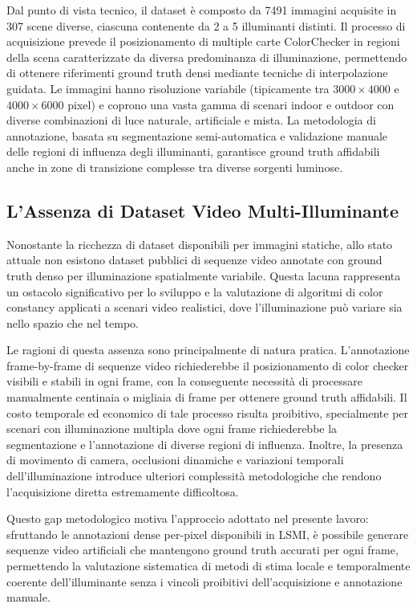 Dal punto di vista tecnico, il dataset è composto da 7491 immagini acquisite in 307 scene diverse, ciascuna contenente da 2 a 5 illuminanti distinti. Il processo di acquisizione prevede il posizionamento di multiple carte ColorChecker in regioni della scena caratterizzate da diversa predominanza di illuminazione, permettendo di ottenere riferimenti ground truth densi mediante tecniche di interpolazione guidata. Le immagini hanno risoluzione variabile (tipicamente tra $3000 \times 4000$ e $4000 \times 6000$ pixel) e coprono una vasta gamma di scenari indoor e outdoor con diverse combinazioni di luce naturale, artificiale e mista. La metodologia di annotazione, basata su segmentazione semi-automatica e validazione manuale delle regioni di influenza degli illuminanti, garantisce ground truth affidabili anche in zone di transizione complesse tra diverse sorgenti luminose.

\clearpage


\vspace{1.5cm}



\subsection{L'Assenza di Dataset Video Multi-Illuminante}

Nonostante la ricchezza di dataset disponibili per immagini statiche, allo stato attuale non esistono dataset pubblici di sequenze video annotate con ground truth denso per illuminazione spatialmente variabile. Questa lacuna rappresenta un ostacolo significativo per lo sviluppo e la valutazione di algoritmi di color constancy applicati a scenari video realistici, dove l'illuminazione può variare sia nello spazio che nel tempo.

Le ragioni di questa assenza sono principalmente di natura pratica. L'annotazione frame-by-frame di sequenze video richiederebbe il posizionamento di color checker visibili e stabili in ogni frame, con la conseguente necessità di processare manualmente centinaia o migliaia di frame per ottenere ground truth affidabili. Il costo temporale ed economico di tale processo risulta proibitivo, specialmente per scenari con illuminazione multipla dove ogni frame richiederebbe la segmentazione e l'annotazione di diverse regioni di influenza. Inoltre, la presenza di movimento di camera, occlusioni dinamiche e variazioni temporali dell'illuminazione introduce ulteriori complessità metodologiche che rendono l'acquisizione diretta estremamente difficoltosa.

Questo gap metodologico motiva l'approccio adottato nel presente lavoro: sfruttando le annotazioni dense per-pixel disponibili in LSMI, è possibile generare sequenze video artificiali che mantengono ground truth accurati per ogni frame, permettendo la valutazione sistematica di metodi di stima locale e temporalmente coerente dell'illuminante senza i vincoli proibitivi dell'acquisizione e annotazione manuale.

